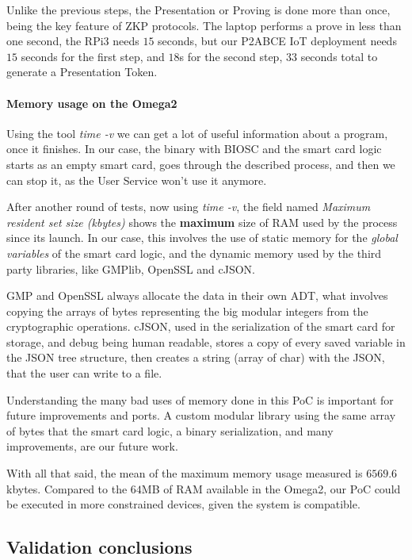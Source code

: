 \documentclass[journal]{IEEEtran}
\begin{document}
Unlike the previous steps, the Presentation or Proving is done more than once, being the key feature of ZKP protocols. The laptop performs a prove in less than one second, the RPi3 needs $15$ seconds, but our P2ABCE IoT deployment needs $15$ seconds for the first step, and $18$s for the second step, $33$ seconds total to generate a Presentation Token.




\hfil

\paragraph{Memory usage on the Omega2}\hfil

Using the tool \textit{time -v} we can get a lot of useful information about a program, once it finishes. In our case, the binary with BIOSC and the smart card logic starts as an empty smart card, goes through the described process, and then we can stop it, as the User Service won't use it anymore.

After another round of tests, now using \textit{time -v}, the field named \textit{Maximum resident set size (kbytes)} shows the \textbf{maximum} size of RAM used by the process since its launch. In our case, this involves the use of static memory for the \textit{global variables} of the smart card logic, and the dynamic memory used by the third party libraries, like GMPlib, OpenSSL and cJSON.

GMP and OpenSSL always allocate the data in their own ADT, what involves copying the arrays of bytes representing the big modular integers from the cryptographic operations. cJSON, used in the serialization of the smart card for storage, and debug being human readable, stores a copy of every saved variable in the JSON tree structure, then creates a string (array of char) with the JSON, that the user can write to a file.

Understanding the many bad uses of memory done in this PoC is important for future improvements and ports. A custom modular library using the same array of bytes that the smart card logic, a binary serialization, and many improvements, are our future work.

With all that said, the mean of the maximum memory usage measured is $6569.6$ kbytes. Compared to the $64$MB of RAM available in the Omega2, our PoC could be executed in more constrained devices, given the system is compatible.




\subsection{Validation conclusions}
\end{document}
